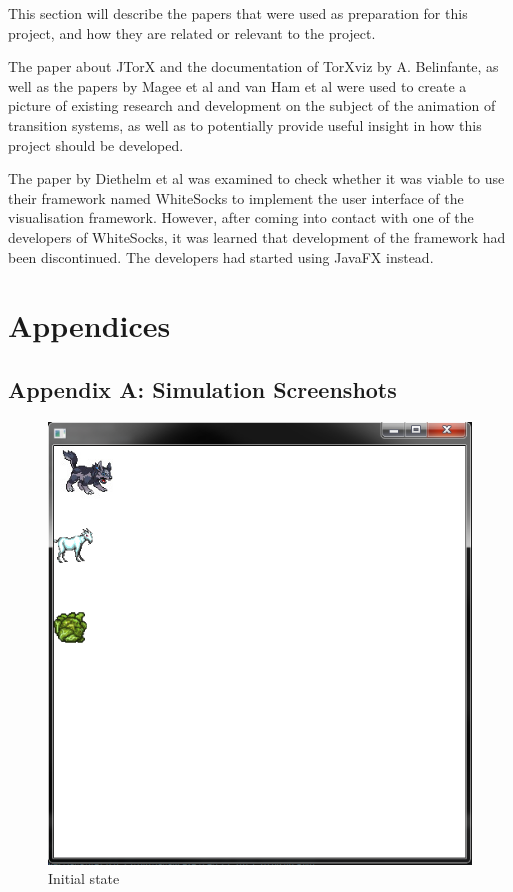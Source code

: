 \documentclass[11pt,a4paper]{article}
\begin{document}
This section will describe the papers that were used as preparation for this project, and how they are related or relevant to the project.

The paper about JTorX and the documentation of TorXviz by A. Belinfante, as well as the papers by Magee et al and van Ham et al were used to create a picture of existing research and development on the subject of the animation of transition systems, as well as to potentially provide useful insight in how this project should be developed.

The paper by Diethelm et al was examined to check whether it was viable to use their framework named WhiteSocks to implement the user interface of the visualisation framework. However, after coming into contact with one of the developers of WhiteSocks, it was learned that development of the framework had been discontinued. The developers had started using JavaFX instead.

\clearpage
\section{Appendices}

\subsection{Appendix A: Simulation Screenshots}

\begin{figure}[ht!]
	\centering
		\includegraphics[width=\textwidth]{1}
	\caption{Initial state}
\end{figure}
\end{document}
